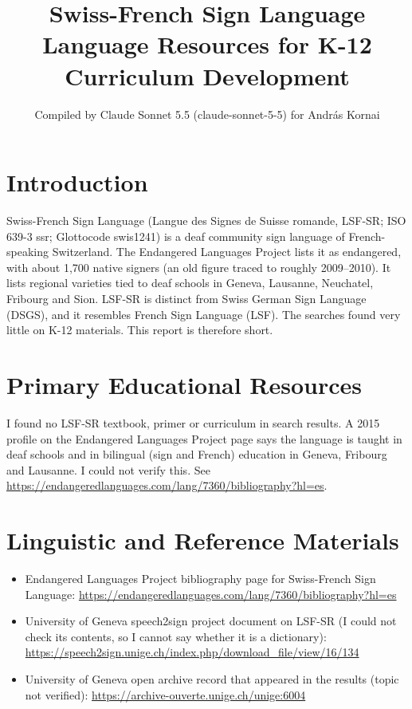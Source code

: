\documentclass[12pt]{article}
\title{Swiss-French Sign Language Language Resources for K-12 Curriculum Development}
\author{Compiled by Claude Sonnet 5.5 (claude-sonnet-5-5) for Andr\'as Kornai}
\date{}
\begin{document}
\maketitle

\section{Introduction}
Swiss-French Sign Language (Langue des Signes de Suisse romande, LSF-SR; ISO 639-3 ssr; Glottocode swis1241) is a deaf community sign language of French-speaking Switzerland. The Endangered Languages Project lists it as endangered, with about 1,700 native signers (an old figure traced to roughly 2009--2010). It lists regional varieties tied to deaf schools in Geneva, Lausanne, Neuchatel, Fribourg and Sion. LSF-SR is distinct from Swiss German Sign Language (DSGS), and it resembles French Sign Language (LSF). The searches found very little on K-12 materials. This report is therefore short.

\section{Primary Educational Resources}
I found no LSF-SR textbook, primer or curriculum in search results. A 2015 profile on the Endangered Languages Project page says the language is taught in deaf schools and in bilingual (sign and French) education in Geneva, Fribourg and Lausanne. I could not verify this. See \url{https://endangeredlanguages.com/lang/7360/bibliography?hl=es}.

\section{Linguistic and Reference Materials}
\begin{itemize}
\item Endangered Languages Project bibliography page for Swiss-French Sign Language: \url{https://endangeredlanguages.com/lang/7360/bibliography?hl=es}
\item University of Geneva speech2sign project document on LSF-SR (I could not check its contents, so I cannot say whether it is a dictionary): \url{https://speech2sign.unige.ch/index.php/download_file/view/16/134}
\item University of Geneva open archive record that appeared in the results (topic not verified): \url{https://archive-ouverte.unige.ch/unige:6004}
\end{itemize}
\end{document}
